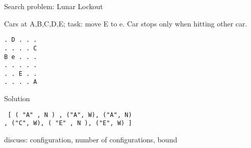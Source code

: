 \begin{slide}{Search problem: Lunar Lockout}

\begin{minipage}{0.6\textwidth}
Cars at A,B,C,D,E; task: move E to e.
Car stops only when hitting other car.
\end{minipage}\quad
\begin{minipage}{0.3\textwidth}
\begin{verbatim}
. D . . . 
. . . . C 
B e . . . 
. . . . . 
. . E . . 
. . . . A 
\end{verbatim}
\end{minipage}

Solution
\begin{verbatim}
 [ ( "A" , N ) , ("A", W), ("A", N)
, ("C", W), ( "E" , N ), ("E", W) ] 
\end{verbatim}
discuss: configuration, number of configurations, bound
\end{slide}
